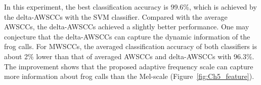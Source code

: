 \begin{table}[htb!]
\centering
\caption{Weighted classification accuracy (mean and standard deviation) comparison for five feature sets with two classifiers.}
\label{tab:accuracyfor24}
\end{table}

In this experiment, the best classification accuracy is 99.6\%, which is achieved by the delta-AWSCCs with the SVM classifier. Compared with the average AWSCCs, the delta-AWSCCs achieved a slightly better performance. One may conjecture that the delta-AWSCCs can capture the dynamic information of the frog calls. For MWSCCs, the averaged classification accuracy of both classifiers is about 2\% lower than that of averaged AWSCCs and delta-AWSCCs with 96.3\%. The improvement shows that the proposed adaptive frequency scale can capture more information about frog calls than the Mel-scale (Figure~\ref{fig:Ch5_feature}). 

